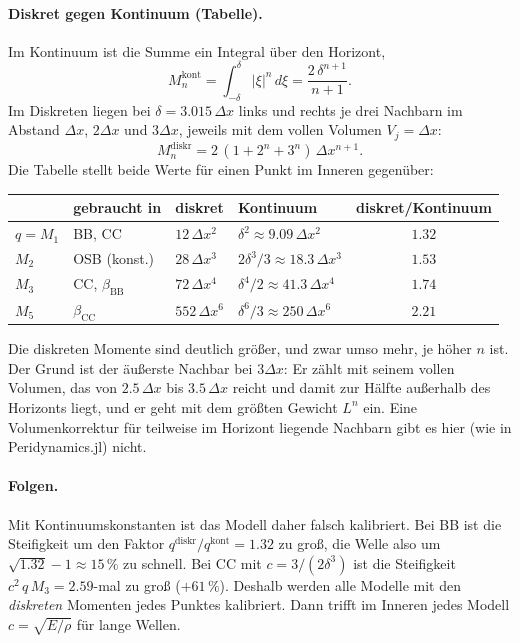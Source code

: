 \documentclass[a4paper,11pt]{article}
\begin{document}
\paragraph{Diskret gegen Kontinuum (Tabelle).} Im Kontinuum ist die Summe ein Integral über den Horizont,
\[
  M_n^{\mathrm{kont}} = \int_{-\delta}^{\delta}|\xi|^n\,d\xi = \frac{2\,\delta^{n+1}}{n+1} .
\]
Im Diskreten liegen bei $\delta = 3.015\,\Delta x$ links und rechts je drei Nachbarn im Abstand $\Delta x$, $2\Delta x$ und $3\Delta x$,
jeweils mit dem vollen Volumen $V_j = \Delta x$:
\[
  M_n^{\mathrm{diskr}} = 2\,(1 + 2^n + 3^n)\,\Delta x^{n+1} .
\]
Die Tabelle stellt beide Werte für einen Punkt im Inneren gegenüber:

\begin{center}
\begin{tabular}{@{}llllc@{}}
  \toprule
  & gebraucht in & diskret & Kontinuum & diskret/Kontinuum \\
  \midrule
  $q = M_1$ & BB, CC           & $12\,\Delta x^2$  & $\delta^2 \approx 9.09\,\Delta x^2$      & $1.32$ \\
  $M_2$     & OSB (konst.)     & $28\,\Delta x^3$  & $2\delta^3/3 \approx 18.3\,\Delta x^3$   & $1.53$ \\
  $M_3$     & CC, $\beta_{\mathrm{BB}}$ & $72\,\Delta x^4$  & $\delta^4/2 \approx 41.3\,\Delta x^4$    & $1.74$ \\
  $M_5$     & $\beta_{\mathrm{CC}}$     & $552\,\Delta x^6$ & $\delta^6/3 \approx 250\,\Delta x^6$     & $2.21$ \\
  \bottomrule
\end{tabular}
\end{center}

Die diskreten Momente sind deutlich größer, und zwar umso mehr, je höher $n$ ist. Der Grund ist der äußerste Nachbar bei
$3\Delta x$: Er zählt mit seinem vollen Volumen, das von $2.5\,\Delta x$ bis $3.5\,\Delta x$ reicht und damit zur Hälfte außerhalb des
Horizonts liegt, und er geht mit dem größten Gewicht $L^n$ ein. Eine Volumenkorrektur für teilweise im Horizont liegende
Nachbarn gibt es hier (wie in Peridynamics.jl) nicht.

\paragraph{Folgen.} Mit Kontinuumskonstanten ist das Modell daher falsch kalibriert. Bei BB ist die Steifigkeit um den Faktor
$q^{\mathrm{diskr}}/q^{\mathrm{kont}} = 1.32$ zu groß, die Welle also um $\sqrt{1.32}-1 \approx 15\,\%$ zu schnell. Bei CC mit
$c = 3/(2\delta^3)$ ist die Steifigkeit $c^2\,q\,M_3 = 2.59$-mal zu groß ($+61\,\%$). Deshalb werden alle Modelle mit den
\emph{diskreten} Momenten jedes Punktes kalibriert. Dann trifft im Inneren jedes Modell $c = \sqrt{E/\rho}$ für lange Wellen.
\end{document}
